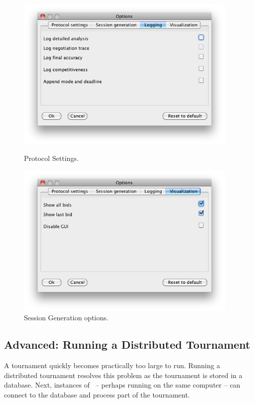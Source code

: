 \documentclass[]{article}
\begin{document}
		\begin{figure}[ht]
		\center
		\begin{minipage}[b]{0.4\linewidth}
			\includegraphics[width=0.95\textwidth]{media/TourOptions3.png}
		\caption{Protocol Settings.}
		\label{fig:TourOptions3}
		\end{minipage}
		\begin{minipage}[b]{0.4\linewidth}
			\includegraphics[width=0.95\textwidth]{media/TourOptions4.png}
		\caption{Session Generation options.}\label{fig:TourOptions4}
		\end{minipage}
		\end{figure}
		
		
\subsection{Advanced: Running a Distributed Tournament}
A tournament quickly becomes practically too large to run. Running a distributed tournament resolves this problem as the tournament is stored in a database. Next, instances of \Genius~-- perhaps running on the same computer -- can connect to the database and process part of the tournament.
\end{document}
